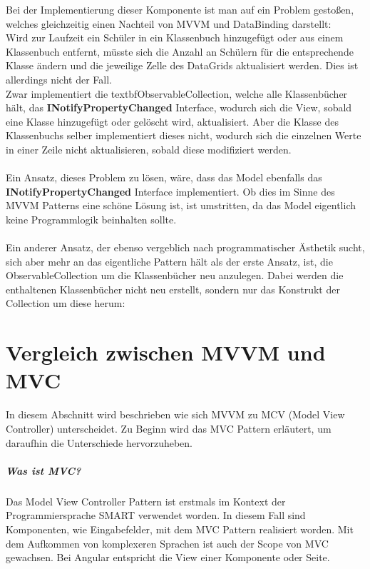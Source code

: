\documentclass[titlepage=false,12pt]{scrreprt}
\begin{document}
\noindent
Bei der Implementierung dieser Komponente ist man auf ein Problem gestoßen, welches gleichzeitig einen Nachteil von MVVM und DataBinding darstellt:\\
Wird zur Laufzeit ein Schüler in ein Klassenbuch hinzugefügt oder aus einem Klassenbuch entfernt, müsste sich die Anzahl an Schülern für die entsprechende Klasse
ändern und die jeweilige Zelle des DataGrids aktualisiert werden. Dies ist allerdings nicht der Fall.\\
Zwar implementiert die textbf{ObservableCollection}, welche alle Klassenbücher hält, das \textbf{INotifyPropertyChanged} Interface, wodurch sich die View, sobald
eine Klasse hinzugefügt oder gelöscht wird, aktualisiert. Aber die Klasse des Klassenbuchs selber implementiert dieses nicht, wodurch sich die einzelnen 
Werte in einer Zeile nicht aktualisieren, sobald diese modifiziert werden.\\
\\
Ein Ansatz, dieses Problem zu lösen, wäre, dass das Model ebenfalls das \textbf{INotifyPropertyChanged} Interface implementiert. Ob dies im Sinne des MVVM
Patterns eine schöne Lösung ist, ist umstritten, da das Model eigentlich keine Programmlogik beinhalten sollte.\\
\\
Ein anderer Ansatz, der ebenso vergeblich nach programmatischer Ästhetik sucht, sich aber mehr an das eigentliche Pattern hält als der erste Ansatz, 
ist, die ObservableCollection um die Klassenbücher neu anzulegen. Dabei werden die enthaltenen Klassenbücher nicht neu erstellt, sondern nur das Konstrukt
der Collection um diese herum:



\chapter{Vergleich zwischen MVVM und MVC}

In diesem Abschnitt wird beschrieben wie sich MVVM zu MCV (Model View Controller) unterscheidet. 
Zu Beginn wird das MVC Pattern erläutert, um daraufhin die Unterschiede hervorzuheben. 

\paragraph{Was ist MVC?}

Das Model View Controller Pattern ist erstmals im Kontext der Programmiersprache SMART verwendet 
worden. In diesem Fall sind Komponenten, wie Eingabefelder, mit dem MVC Pattern realisiert worden.
Mit dem Aufkommen von komplexeren Sprachen ist auch der Scope von MVC gewachsen. Bei Angular
entspricht die View einer Komponente oder Seite.
\end{document}
